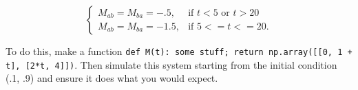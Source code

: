\documentclass[]{article}
\begin{document}
\begin{itemize}
  \begin{equation}
    \begin{cases}
  M_{ab} = M_{ba} = -.5, & \text{if } t < 5 \text{ or } t > 20 \\
  M_{ab} = M_{ba} = -1.5, & \text{if } 5 <= t <= 20.
    \end{cases}
    \end{equation}

  To do this, make a function \texttt{def M(t): some stuff; return
    np.array([[0, 1 + t], [2*t, 4]])}. Then simulate this system
  starting from the initial condition (.1, .9) and ensure it does what
  you would expect.
\end{itemize}
\end{document}
